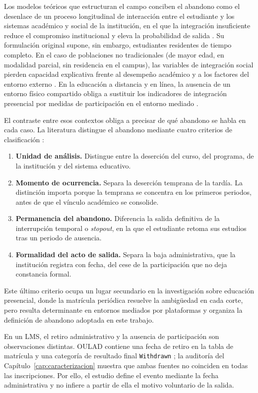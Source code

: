Los modelos teóricos que estructuran el campo conciben el abandono como el desenlace de un proceso longitudinal de interacción entre el estudiante y los sistemas académico y social de la institución, en el que la integración insuficiente reduce el compromiso institucional y eleva la probabilidad de salida \cite{spady1970,tinto1975,tinto1993}. Su formulación original supone, sin embargo, estudiantes residentes de tiempo completo. En el caso de poblaciones no tradicionales (de mayor edad, en modalidad parcial, sin residencia en el campus), las variables de integración social pierden capacidad explicativa frente al desempeño académico y a los factores del entorno externo \cite{beanmetzner1985}. En la educación a distancia y en línea, la ausencia de un entorno físico compartido obliga a sustituir los indicadores de integración presencial por medidas de participación en el entorno mediado \cite{rovai2003}.

El contraste entre esos contextos obliga a precisar de qué abandono se habla en cada caso. La literatura distingue el abandono mediante cuatro criterios de clasificación \cite{himmel2002,men2009,1049482020222124425}:
\begin{enumerate}
\item \textbf{Unidad de análisis.} Distingue entre la deserción del curso, del programa, de la institución y del sistema educativo.
\item \textbf{Momento de ocurrencia.} Separa la deserción temprana de la tardía. La distinción importa porque la temprana se concentra en los primeros periodos, antes de que el vínculo académico se consolide.
\item \textbf{Permanencia del abandono.} Diferencia la salida definitiva de la interrupción temporal o \textit{stopout}, en la que el estudiante retoma sus estudios tras un periodo de ausencia.
\item \textbf{Formalidad del acto de salida.} Separa la baja administrativa, que la institución registra con fecha, del cese de la participación que no deja constancia formal.
\end{enumerate}


Este último criterio ocupa un lugar secundario en la investigación sobre educación presencial, donde la matrícula periódica resuelve la ambigüedad en cada corte, pero resulta determinante en entornos mediados por plataformas y organiza la definición de abandono adoptada en este trabajo.

En un LMS, el retiro administrativo y la ausencia de participación son observaciones distintas. OULAD contiene una fecha de retiro en la tabla de matrícula y una categoría de resultado final \texttt{Withdrawn} \cite{sdata2017171}; la auditoría del Capítulo~\ref{cap:caracterizacion} muestra que ambas fuentes no coinciden en todas las inscripciones. Por ello, el estudio define el evento mediante la fecha administrativa y no infiere a partir de ella el motivo voluntario de la salida.

